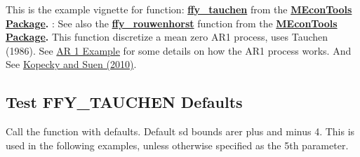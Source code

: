 \documentclass[
]{book}
\begin{document}
This is the example vignette for function:
\href{https://github.com/FanWangEcon/MEconTools/blob/master/MEconTools/external/stats/ffy_tauchen.m}{\textbf{ffy\_tauchen}}
from the \href{https://fanwangecon.github.io/MEconTools/}{\textbf{MEconTools
Package}}\textbf{.} : See also
the
\href{https://github.com/FanWangEcon/MEconTools/blob/master/MEconTools/external/stats/ffy_rouwenhorst.m}{\textbf{ffy\_rouwenhorst}}
function from the \href{https://fanwangecon.github.io/MEconTools/}{\textbf{MEconTools
Package}}\textbf{.} This function
discretize a mean zero AR1 process, uses Tauchen (1986). See \href{https://fanwangecon.github.io/M4Econ/panel/timeseries/htmlpdfm/fs_autoregressive.html}{AR 1
Example}
for some details on how the AR1 process works. And See \href{https://doi.org/10.1016/j.red.2010.02.002}{Kopecky and Suen
(2010)}.

\hypertarget{test-ffy_tauchen-defaults}{%
\subsection{Test FFY\_TAUCHEN Defaults}\label{test-ffy_tauchen-defaults}}

Call the function with defaults. Default sd bounds arer plus and minus
4. This is used in the following examples, unless otherwise specified as
the 5th parameter.
\end{document}
